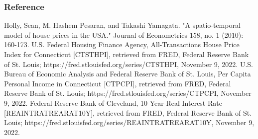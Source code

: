 \documentclass{beamer}
\begin{document}
\begin{frame}
\frametitle{Reference}

\begin{thebibliography}{10}
Holly, Sean, M. Hashem Pesaran, and Takashi Yamagata. "A spatio-temporal model of house prices in the USA." Journal of Econometrics 158, no. 1 (2010): 160-173.
U.S. Federal Housing Finance Agency, All-Transactions House Price Index for Connecticut [CTSTHPI], retrieved from FRED, Federal Reserve Bank of St. Louis; https://fred.stlouisfed.org/series/CTSTHPI, November 9, 2022.
U.S. Bureau of Economic Analysis and Federal Reserve Bank of St. Louis, Per Capita Personal Income in Connecticut [CTPCPI], retrieved from FRED, Federal Reserve Bank of St. Louis; https://fred.stlouisfed.org/series/CTPCPI, November 9, 2022.
Federal Reserve Bank of Cleveland, 10-Year Real Interest Rate [REAINTRATREARAT10Y], retrieved from FRED, Federal Reserve Bank of St. Louis; https://fred.stlouisfed.org/series/REAINTRATREARAT10Y, November 9, 2022.

\end{thebibliography}
\end{frame}
\end{document}
